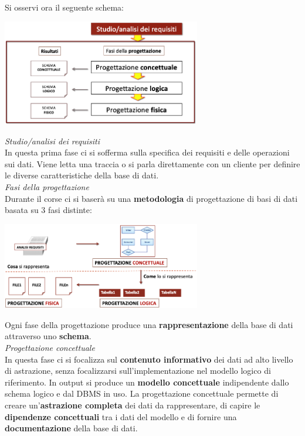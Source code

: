 \documentclass{article}
\begin{document}
Si osservi ora il seguente schema:
\begin{center}
    \includegraphics[width=0.65\textwidth]{foto 2.png}
\end{center}
\textit{Studio/analisi dei requisiti}\\
In questa prima fase ci si sofferma sulla specifica dei requisiti e delle operazioni sui dati. Viene letta una traccia o si parla direttamente con un cliente per definire le diverse caratteristiche della base di dati.\vspace*{14pt}\\
\textit{Fasi della progettazione}\\
Durante il corse ci si baserà su una \textbf{metodologia} di progettazione di basi di dati basata su 3 fasi distinte:
\begin{center}
    \includegraphics[width=0.65\textwidth]{foto 3.png}
\end{center}
Ogni fase della progettazione produce una \textbf{rappresentazione} della base di dati attraverso uno \textbf{schema}.\vspace*{14pt}\\
\textit{Progettazione concettuale}\\
In questa fase ci si focalizza sul \textbf{contenuto informativo} dei dati ad alto livello di astrazione, senza focalizzarsi sull'implementazione nel modello logico di riferimento. In output si produce un \textbf{modello concettuale} indipendente dallo schema logico e dal DBMS in uso. La progettazione concettuale permette di creare un'\textbf{astrazione completa} dei dati da rappresentare, di capire le \textbf{dipendenze concettuali} tra i dati del modello e di fornire una \textbf{documentazione} della base di dati.\\
\end{document}
